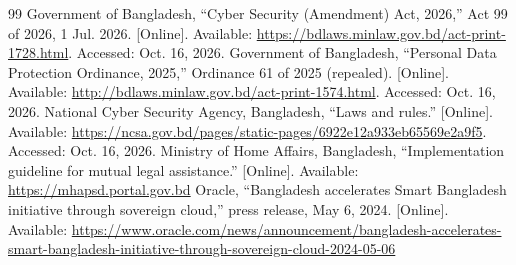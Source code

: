 \documentclass[conference]{IEEEtran}
\begin{document}
\begin{thebibliography}{99}
 Government of Bangladesh, ``Cyber Security (Amendment) Act, 2026,'' Act 99 of 2026, 1 Jul. 2026. [Online]. Available: \url{https://bdlaws.minlaw.gov.bd/act-print-1728.html}. Accessed: Oct. 16, 2026.
 Government of Bangladesh, ``Personal Data Protection Ordinance, 2025,'' Ordinance 61 of 2025 (repealed). [Online]. Available: \url{http://bdlaws.minlaw.gov.bd/act-print-1574.html}. Accessed: Oct. 16, 2026.
 National Cyber Security Agency, Bangladesh, ``Laws and rules.'' [Online]. Available: \url{https://ncsa.gov.bd/pages/static-pages/6922e12a933eb65569e2a9f5}. Accessed: Oct. 16, 2026.
 Ministry of Home Affairs, Bangladesh, ``Implementation guideline for mutual legal assistance.'' [Online]. Available: \url{https://mhapsd.portal.gov.bd}
 Oracle, ``Bangladesh accelerates Smart Bangladesh initiative through sovereign cloud,'' press release, May 6, 2024. [Online]. Available: \url{https://www.oracle.com/news/announcement/bangladesh-accelerates-smart-bangladesh-initiative-through-sovereign-cloud-2024-05-06}
\end{thebibliography}
\end{document}
